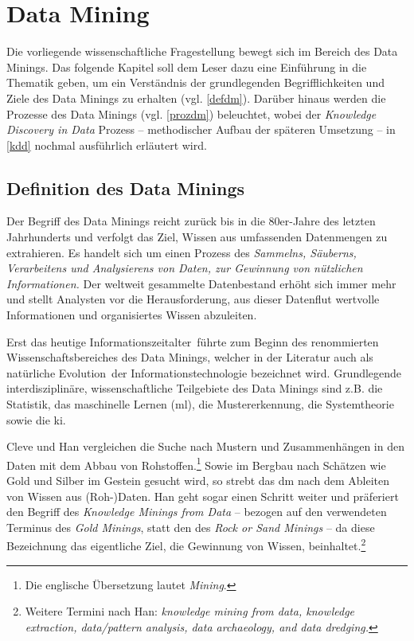 \section{Data Mining}
\label{dm}
Die vorliegende wissenschaftliche Fragestellung bewegt sich im Bereich des Data Minings. Das folgende Kapitel soll dem Leser dazu eine Einführung in die Thematik geben, um ein Verständnis der grundlegenden Begrifflichkeiten und Ziele des Data Minings zu erhalten (vgl. \vref{defdm}). Darüber hinaus werden die Prozesse des Data Minings (vgl. \vref{prozdm}) beleuchtet, wobei der \textit{Knowledge Discovery in Data} Prozess -- methodischer Aufbau der späteren Umsetzung -- in \vref{kdd} nochmal ausführlich erläutert wird.

\subsection{Definition des Data Minings}
\label{defdm}

Der Begriff des Data Minings reicht zurück bis in die 80er-Jahre des letzten Jahrhunderts und verfolgt das Ziel, Wissen aus umfassenden Datenmengen zu extrahieren. Es handelt sich um einen Prozess des \glqq  \textit{Sammelns, Säuberns, Verarbeitens und Analysierens von Daten, zur Gewinnung von nützlichen Informationen.}\grqq{} Der weltweit gesammelte Datenbestand erhöht sich immer mehr und stellt Analysten vor die Herausforderung, aus dieser Datenflut wertvolle Informationen und organisiertes Wissen abzuleiten.

Erst das heutige \glqq Informationszeitalter\grqq~führte zum Beginn des renommierten Wissenschaftsbereiches des Data Minings, welcher in der Literatur auch als \glqq natürliche Evolution\grqq~der Informationstechnologie bezeichnet wird. Grundlegende interdisziplinäre, wissenschaftliche Teilgebiete des Data Minings sind z.B. die Statistik, das maschinelle Lernen (\gls{ml}), die Mustererkennung, die Systemtheorie sowie die \gls{ki}.


Cleve und Han vergleichen die Suche nach Mustern und Zusammenhängen in den Daten mit dem Abbau von Rohstoffen.\footnote{Die englische Übersetzung lautet \textit{\glqq Mining\grqq}.} Sowie im Bergbau nach Schätzen wie Gold und Silber im Gestein gesucht wird, so strebt das \gls{dm} nach dem Ableiten von Wissen aus (Roh-)Daten. Han geht sogar einen Schritt weiter und präferiert den Begriff des \textit{Knowledge Minings from Data} -- bezogen auf den verwendeten Terminus des \textit{Gold Minings}, statt den des \textit{Rock or Sand Minings} -- da diese Bezeichnung das eigentliche Ziel, die Gewinnung von Wissen, beinhaltet.\footnote{Weitere Termini nach Han: \textit{knowledge mining from data, knowledge extraction, data/pattern analysis, data archaeology, and data dredging.}}

